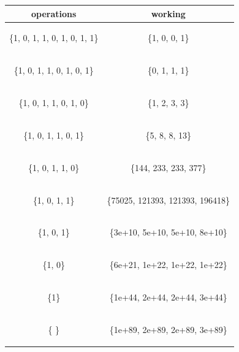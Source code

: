 \documentclass[a4paper,12pt]{article}
\numberwithin{definition}{section}
\numberwithin{mytheorem}{subsection}
\begin{document}
\centering
\begin{tabular}{ |c|c| } 
 \hline
 \textbf{operations} & \textbf{working}  \\ 
 \hline
 \begin{flushleft}{ \{1, 0, 1, 1, 0, 1, 0, 1, 1\}}\end{flushleft} & \{1, 0, 0, 1\}  \\ 
 \hline
 \begin{flushleft}{ \{1, 0, 1, 1, 0, 1, 0, 1\}}\end{flushleft} & \{0, 1, 1, 1\}  \\ 
 \hline
 \begin{flushleft}{ \{1, 0, 1, 1, 0, 1, 0\}}\end{flushleft} & \{1, 2, 3, 3\}  \\ 
 \hline
\begin{flushleft}{ \{1, 0, 1, 1, 0, 1\}}\end{flushleft} & \{5, 8, 8, 13\}  \\ 
 \hline
 \begin{flushleft}{ \{1, 0, 1, 1, 0\}}\end{flushleft} & \{144, 233, 233, 377\}  \\ 
 \hline
 \begin{flushleft}{ \{1, 0, 1, 1\}}\end{flushleft} & \{75025, 121393, 121393, 196418\}  \\ 
 \hline
 \begin{flushleft}{ \{1, 0, 1\}}\end{flushleft} & \{3e+10, 5e+10, 5e+10, 8e+10\}  \\
 \hline
 \begin{flushleft}{ \{1, 0\}}\end{flushleft}  & \{6e+21, 1e+22,  1e+22, 1e+22\}  \\ 
 \hline
 \begin{flushleft}{ \{1\}}\end{flushleft}  & \{1e+44, 2e+44, 2e+44, 3e+44\}  \\
 \hline
 \begin{flushleft}{ \{ \}}\end{flushleft}  & \{1e+89, 2e+89, 2e+89, 3e+89\} \\ 
 
 
 
 
 \hline
\end{tabular}
\end{document}

